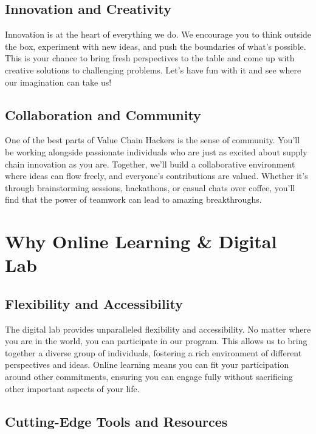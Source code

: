 \documentclass[
  letterpaper,
  DIV=11,
  numbers=noendperiod]{scrreprt}
\begin{document}
\subsection{Innovation and Creativity}\label{innovation-and-creativity}

Innovation is at the heart of everything we do. We encourage you to
think outside the box, experiment with new ideas, and push the
boundaries of what's possible. This is your chance to bring fresh
perspectives to the table and come up with creative solutions to
challenging problems. Let's have fun with it and see where our
imagination can take us!

\subsection{Collaboration and
Community}\label{collaboration-and-community}

One of the best parts of Value Chain Hackers is the sense of community.
You'll be working alongside passionate individuals who are just as
excited about supply chain innovation as you are. Together, we'll build
a collaborative environment where ideas can flow freely, and everyone's
contributions are valued. Whether it's through brainstorming sessions,
hackathons, or casual chats over coffee, you'll find that the power of
teamwork can lead to amazing breakthroughs.

\section{Why Online Learning \& Digital
Lab}\label{why-online-learning-digital-lab}

\subsection{Flexibility and
Accessibility}\label{flexibility-and-accessibility}

The digital lab provides unparalleled flexibility and accessibility. No
matter where you are in the world, you can participate in our program.
This allows us to bring together a diverse group of individuals,
fostering a rich environment of different perspectives and ideas. Online
learning means you can fit your participation around other commitments,
ensuring you can engage fully without sacrificing other important
aspects of your life.

\subsection{Cutting-Edge Tools and
Resources}\label{cutting-edge-tools-and-resources}
\end{document}
